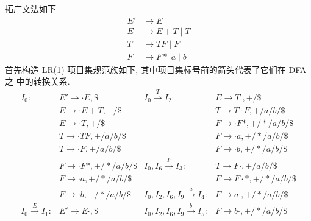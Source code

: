 \documentclass[boxes]{homework}
\begin{document}
\begin{solution}
    拓广文法如下
    \begin{equation}
        \begin{aligned}
            E' & \to E                 \\
            E  & \to E + T \mid T      \\
            T  & \to T F \mid F        \\
            F  & \to F * \mid a \mid b
        \end{aligned}
    \end{equation}
    首先构造 LR\.(1) 项目集规范族如下, 其中项目集标号前的箭头代表了它们在 DFA 之
    中的转换关系.
    \begin{equation}
        \begin{aligned}
            I_{0}:                      & E' \to \cdot E, \$                  & I_{0}\xrightarrow{T} I_{2}:                      & E \to T., + / \$                    \\
                                        & E \to \cdot E + T, + / \$           &                                                  & T \to T \cdot F, + / a / b / \$     \\
                                        & E \to \cdot T, + / \$               &                                                  & F \to \cdot F *, + / * / a / b / \$ \\
                                        & T \to \cdot T F, + / a / b / \$     &                                                  & F \to \cdot a, + / * / a / b / \$   \\
                                        & T \to \cdot F, + / a / b / \$       &                                                  & F \to \cdot b, + / * / a / b / \$   \\
                                        & F \to \cdot F *, + / * / a / b / \$ & I_{0}, I_{6}\xrightarrow{F} I_{3}:               & T \to F \cdot, + / a / b / \$       \\
                                        & F \to \cdot a, + / * / a / b / \$   &                                                  & F \to F \cdot *, + / * / a / b / \$ \\
                                        & F \to \cdot b, + / * / a / b / \$   & I_{0}, I_{2}, I_{6}, I_{9}\xrightarrow{a} I_{4}: & F \to a \cdot, + / * / a / b / \$   \\
            I_{0}\xrightarrow{E} I_{1}: & E' \to E \cdot, \$                  & I_{0}, I_{2}, I_{6}, I_{9}\xrightarrow{b} I_{5}: & F \to b \cdot, + / * / a / b / \$   \\

\end{aligned}
\end{equation}
\end{solution}
\end{document}
